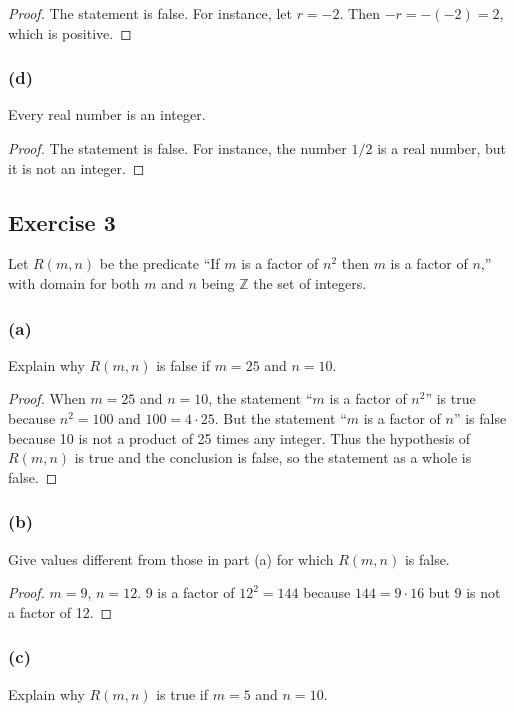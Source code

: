 \documentclass[14pt]{extarticle}
\newcommand{\Z}{\mathbb{Z}}
\begin{document}
\begin{proof}
The statement is false. For instance, let $r = -2$. Then $-r = -(-2) = 2$, which is positive.
\end{proof}

\subsubsection{(d)}
Every real number is an integer.

\begin{proof}
The statement is false. For instance, the number $1/2$ is a real number, but it is not an integer.
\end{proof}

\subsection{Exercise 3}
Let $R(m, n)$ be the predicate “If $m$ is a factor of $n^2$ then $m$ is a factor of $n$,” with domain for both $m$ and $n$ being $\Z$ the set of integers.

\subsubsection{(a)}
Explain why $R(m, n)$ is false if $m = 25$ and $n = 10$.

\begin{proof}
When $m = 25$ and $n = 10$, the statement “$m$ is a factor of $n^2$” is true because $n^2 = 100$ and $100 = 4 \cdot 25$. But the statement “$m$ is a factor of $n$” is false because 10 is not a product of 25 times any integer. Thus the hypothesis of $R(m, n)$ is true and the conclusion is false, so the statement as a whole is false.
\end{proof}

\subsubsection{(b)}
Give values different from those in part (a) for which $R(m, n)$ is false.

\begin{proof}
$m = 9$, $n = 12$. 9 is a factor of $12^2 = 144$ because $144 = 9 \cdot 16$ but 9 is not a factor of 12.
\end{proof}

\subsubsection{(c)}
Explain why $R(m, n)$ is true if $m = 5$ and $n = 10$.
\end{document}
